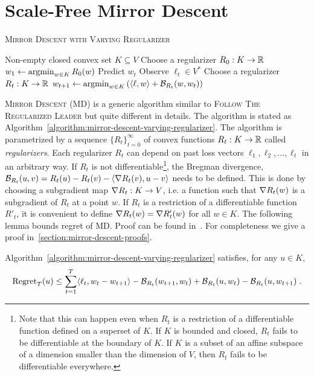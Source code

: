 \section{Scale-Free Mirror Descent}
\label{section:mirror-descent}

\begin{algorithm}[t]
\caption{\textsc{Mirror Descent with Varying Regularizer}}
\label{algorithm:mirror-descent-varying-regularizer}
\begin{algorithmic}[1]
\REQUIRE Non-empty closed convex set $K \subseteq V$
\STATE Choose a regularizer $R_0:K \to \mathbb{R}$
\STATE $w_1 \leftarrow \operatorname*{argmin}_{w \in K} R_0(w)$
\STATE Predict $w_t$
\STATE Observe $\ell_t \in V^*$
\STATE Choose a regularizer $R_t:K \to \mathbb{R}$
\STATE $w_{t+1} \leftarrow \operatorname*{argmin}_{w \in K} \left( \langle \ell, w \rangle + \mathcal{B}_{R_t}(w, w_t) \right)$
\ENDFOR
\end{algorithmic}
\end{algorithm}


\textsc{Mirror Descent} (MD) is a generic algorithm similar to \textsc{Follow The
Regularized Leader} but quite different in details. The algorithm is stated as
Algorithm~\ref{algorithm:mirror-descent-varying-regularizer}. The algorithm is
parametrized by a sequence $\{R_t\}_{t=0}^\infty$ of convex functions $R_t:K
\to \mathbb{R}$ called \emph{regularizers}. Each regularizer $R_t$ can depend on past
loss vectors $\ell_1, \ell_2, \dots, \ell_t$ in an arbitrary way. If $R_t$ is
not differentiable\footnote{Note that this can happen even when $R_t$ is a
restriction of a differentiable function defined on a superset of $K$.  If $K$
is bounded and closed, $R_t$ fails to be differentiable at the boundary of $K$.
If $K$ is a subset of an affine subspace of a dimension smaller than the
dimension of $V$, then $R_t$ fails to be differentiable everywhere.}, the
Bregman divergence, $\mathcal{B}_{R_t}(u,v) = R_t(u) - R_t(v) - \langle \nabla R_t(v),
u - v \rangle$ needs to be defined. This is done by choosing a subgradient map
$\nabla R_t:K \to V$, i.e. a function such that $\nabla R_t(w)$ is a subgradient
of $R_t$ at a point $w$. If $R_t$ is a restriction of a differentiable function
$R'_t$, it is convenient to define $\nabla R_t(w) = \nabla R'_t(w)$ for all $w
\in K$. The following lemma bounds regret of \textsc{MD}.  Proof
can be found
in~\cite{Rakhlin-Sridharan-2009,Duchi-Shalev-Shwartz-Singer-Tewari-2010}.  For
completeness we give a proof in~\ref{section:mirror-descent-proofs}.

\begin{lemma}
\label{lemma:mirror-descent-regret}
Algorithm~\ref{algorithm:mirror-descent-varying-regularizer} satisfies, for any
$u \in K$,
$$
\operatorname{Regret}_T(u)
\le
\sum_{t=1}^T \langle \ell_t, w_t - w_{t+1} \rangle - \mathcal{B}_{R_t}(w_{t+1}, w_t) + \mathcal{B}_{R_t}(u,w_t) - \mathcal{B}_{R_t}(u, w_{t+1}) \; .
$$
\end{lemma}

